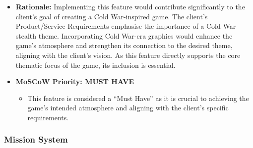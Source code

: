 \documentclass[11pt, a4paper]{article}
\begin{document}
\begin{itemize}
    \item \textbf{Rationale:} Implementing this feature would contribute significantly to the client’s goal of creating a Cold War-inspired game. The client’s Product/Service Requirements emphasise the importance of a Cold War stealth theme. Incorporating Cold War-era graphics would enhance the game’s atmosphere and strengthen its connection to the desired theme, aligning with the client’s vision. As this feature directly supports the core thematic focus of the game, its inclusion is essential.

    \item \textbf{MoSCoW Priority: MUST HAVE}

          \begin{itemize}
              \item This feature is considered a “Must Have” as it is crucial to achieving the game’s intended atmosphere and aligning with the client’s specific requirements.
          \end{itemize}
\end{itemize}

\newpage

\subsubsection{Mission System}
\end{document}
